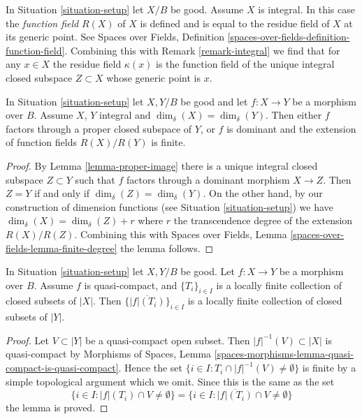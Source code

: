 \begin{remark}
\label{remark-function-field}
In Situation \ref{situation-setup} let $X/B$ be good. Assume $X$ is integral.
In this case the {\it function field} $R(X)$ of $X$ is defined and
is equal to the residue field of $X$ at its generic point.
See Spaces over Fields, Definition
\ref{spaces-over-fields-definition-function-field}.
Combining this with Remark \ref{remark-integral}
we find that for any $x \in X$ the residue field
$\kappa(x)$ is the function field of the
unique integral closed subspace $Z \subset X$
whose generic point is $x$.
\end{remark}

\begin{lemma}
\label{lemma-equal-dimension}
In Situation \ref{situation-setup} let $X, Y/B$ be good and let
$f : X \to Y$ be a morphism over $B$.
Assume $X$, $Y$ integral and $\dim_\delta(X) = \dim_\delta(Y)$.
Then either $f$ factors through a proper closed subspace
of $Y$, or $f$ is dominant and the extension of function fields
$R(X) / R(Y)$ is finite.
\end{lemma}

\begin{proof}
By Lemma \ref{lemma-proper-image} there is a unique integral closed
subspace $Z \subset Y$ such that $f$ factors through a dominant
morphism $X \to Z$. Then $Z = Y$ if and only if
$\dim_\delta(Z) = \dim_\delta(Y)$. On the other hand, by
our construction of dimension functions (see Situation \ref{situation-setup})
we have $\dim_\delta(X) = \dim_\delta(Z) + r$ where $r$ the
transcendence degree of the extension $R(X)/R(Z)$. Combining this with
Spaces over Fields, Lemma \ref{spaces-over-fields-lemma-finite-degree}
the lemma follows.
\end{proof}

\begin{lemma}
\label{lemma-quasi-compact-locally-finite}
In Situation \ref{situation-setup} let $X, Y/B$ be good.
Let $f : X \to Y$ be a morphism over $B$.
Assume $f$ is quasi-compact, and $\{T_i\}_{i \in I}$ is a locally
finite collection of closed subsets of $|X|$.
Then $\{\overline{|f|(T_i)}\}_{i \in I}$ is a locally finite
collection of closed subsets of $|Y|$.
\end{lemma}

\begin{proof}
Let $V \subset |Y|$ be a quasi-compact open subset.
Then $|f|^{-1}(V) \subset |X|$ is quasi-compact
by Morphisms of Spaces, Lemma
\ref{spaces-morphisms-lemma-quasi-compact-is-quasi-compact}.
Hence the set
$\{i \in I : T_i \cap |f|^{-1}(V) \not = \emptyset \}$
is finite by a simple topological argument which we omit.
Since this is the same as the set
$$
\{i \in I : |f|(T_i) \cap V \not = \emptyset \} =
\{i \in I : \overline{|f|(T_i)} \cap V \not = \emptyset \}
$$
the lemma is proved.
\end{proof}










